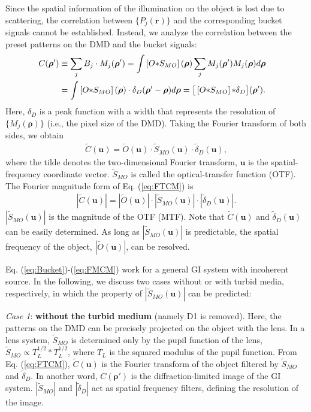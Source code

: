 \documentclass[amsmath,amssymb,aps,prl,groupedaddress,floatfix,12pt]{revtex4-1}
\begin{document}
Since the spatial information of the illumination on the object is lost due to scattering, the correlation between $\{P_j({\boldsymbol r})\}$ and the corresponding bucket signals cannot be established. Instead, we analyze the correlation between the preset patterns on the DMD and the bucket signals:
\begin{align}\label{eq:CM}    
    C({\boldsymbol \rho'})&\equiv \sum_j B_j \cdot M_j({\boldsymbol \rho'})=\int \left[O {\ast} S_{MO}\right]({\boldsymbol \rho})\sum_j M_j({\boldsymbol \rho'})M_j({\boldsymbol \rho})d{\boldsymbol \rho}\cr
    &=\int \left[O {\ast} S_{MO}\right]({\boldsymbol \rho})\cdot \delta_D({\boldsymbol \rho'}-{\boldsymbol \rho})d{\boldsymbol \rho}=\big[\left[O {\ast} S_{MO}\right]{\ast}\delta_D\big]({\boldsymbol \rho'}).
\end{align}
Here, $\delta_D$ is a peak function with a width that represents the resolution of $\{M_j({\boldsymbol \rho})\}$ (i.e., the pixel size of the DMD). Taking the Fourier transform of both sides, we obtain
\begin{align}\label{eq:FTCM}    
    \tilde{C}({\boldsymbol u})=\tilde{O}({\boldsymbol u})\cdot \tilde{S}_{MO}({\boldsymbol u})\cdot \tilde{\delta}_{D}({\boldsymbol u}),
\end{align} 
where the tilde denotes the two-dimensional Fourier transform, ${\boldsymbol u}$ is the spatial-frequency coordinate vector. $\tilde{S}_{MO}$ is called the optical-transfer function (OTF). The Fourier magnitude form of Eq. (\ref{eq:FTCM}) is 
\begin{align}\label{eq:FMCM}    
    |\tilde{C}({\boldsymbol u})|=|\tilde{O}({\boldsymbol u})|\cdot |\tilde{S}_{MO}({\boldsymbol u})|\cdot |\tilde{\delta}_{D}({\boldsymbol u})|.
\end{align}
$|\tilde{S}_{MO}({\boldsymbol u})|$ is the magnitude of the OTF (MTF). Note that $\tilde{C}({\boldsymbol u})$ and $\tilde{\delta}_{D}({\boldsymbol u})$ can be easily determined. As long as $|\tilde{S}_{MO}({\boldsymbol u})|$ is predictable, the spatial frequency of the object, $|\tilde{O}({\boldsymbol u})|$, can be resolved. 

Eq. (\ref{eq:Bucket})-(\ref{eq:FMCM}) work for a general GI system with incoherent source. In the following, we discuss two cases without or with turbid media, respectively, in which the property of $|\tilde{S}_{MO}({\boldsymbol u})|$ can be predicted:

{\it Case 1}: {\bf without the turbid medium} (namely D1 is removed). Here, the patterns on the DMD can be precisely projected on the object with the lens. In a lens system, $\tilde{S}_{MO}$ is determined only by the pupil function of the lens, $\tilde{S}_{MO}\propto T_L^{1/2}{\ast}T_L^{1/2}$,  where $T_L$ is the squared modulus of the pupil function. From Eq.  (\ref{eq:FTCM}), $\tilde{C}({\boldsymbol u})$ is the Fourier transform of the object filtered by $\tilde{S}_{MO}$ and $\tilde{\delta}_{D}$. In another word, $C({\boldsymbol \rho'})$ is the diffraction-limited image of the GI system.
$|\tilde{S}_{MO}|$ and $|\tilde{\delta}_{D}|$ act as spatial frequency filters, defining the resolution of the image. 
\end{document}
